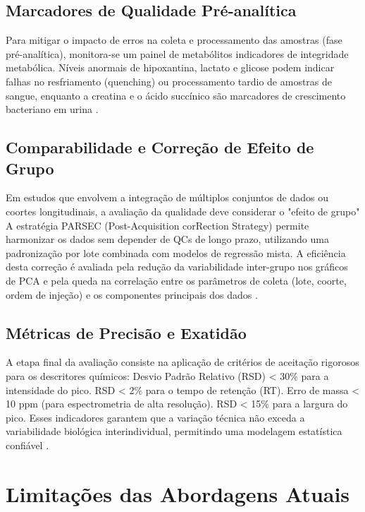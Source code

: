 \subsection{Marcadores de Qualidade Pré-analítica}

Para mitigar o impacto de erros na coleta e processamento das amostras (fase pré-analítica), monitora-se um painel de metabólitos indicadores de integridade metabólica. Níveis anormais de hipoxantina, lactato e glicose podem indicar falhas no resfriamento (quenching) ou processamento tardio de amostras de sangue, enquanto a creatina e o ácido succínico são marcadores de crescimento bacteriano em urina \cite{doi:10.1021/acs.analchem.3c03660}.

\subsection{Comparabilidade e Correção de Efeito de Grupo}

Em estudos que envolvem a integração de múltiplos conjuntos de dados ou coortes longitudinais, a avaliação da qualidade deve considerar o "efeito de grupo" \cite{SALANON2025344753} A estratégia PARSEC (Post-Acquisition corRection Strategy) permite harmonizar os dados sem depender de QCs de longo prazo, utilizando uma padronização por lote combinada com modelos de regressão mista. A eficiência desta correção é avaliada pela redução da variabilidade inter-grupo nos gráficos de PCA e pela queda na correlação entre os parâmetros de coleta (lote, coorte, ordem de injeção) e os componentes principais dos dados \cite{SALANON2025344753}.

\subsection{Métricas de Precisão e Exatidão}

A etapa final da avaliação consiste na aplicação de critérios de aceitação rigorosos para os descritores químicos:
Desvio Padrão Relativo (RSD) < 30\% para a intensidade do pico.
RSD < 2\% para o tempo de retenção (RT).
Erro de massa < 10 ppm (para espectrometria de alta resolução).
RSD < 15\% para a largura do pico.
Esses indicadores garantem que a variação técnica não exceda a variabilidade biológica interindividual, permitindo uma modelagem estatística confiável \cite{doi:10.1021/acs.analchem.3c03660, SALANON2025344753}. 

\section{\textbf{Limitações das Abordagens Atuais}}

